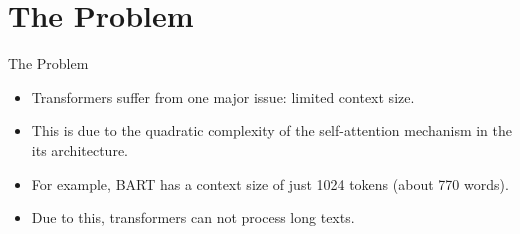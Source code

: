 \section{The Problem}

	\begin{frame}{The Problem}

		\begin{itemize}
			\item Transformers suffer from one major issue: limited context size.
			\item This is due to the quadratic complexity of the self-attention mechanism in
			the its architecture.
			\item For example, BART has a context size of just 1024 tokens (about 770 words).
			\item Due to this, transformers can not process long texts.
		\end{itemize}

	\end{frame}
